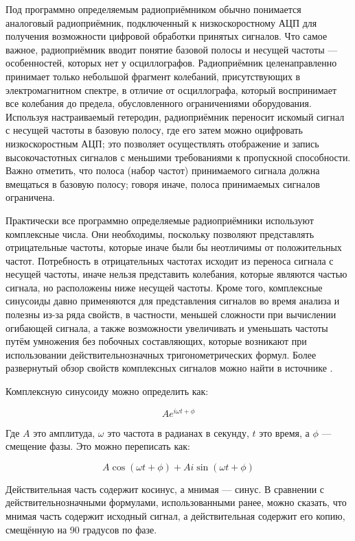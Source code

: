 \documentclass{report}
\begin{document}
Под программно определяемым радиоприёмником обычно понимается аналоговый радиоприёмник, подключенный к низкоскоростному АЦП для получения возможности цифровой обработки принятых сигналов. Что самое важное, радиоприёмник вводит понятие базовой полосы и несущей частоты --- особенностей, которых нет у осциллографов. Радиоприёмник целенаправленно принимает только небольшой фрагмент колебаний, присутствующих в электромагнитном спектре, в отличие от осциллографа, который воспринимает все колебания до предела, обусловленного ограничениями оборудования. Используя настраиваемый гетеродин, радиоприёмник переносит искомый сигнал с несущей частоты в базовую полосу, где его затем можно оцифровать низкоскоростным АЦП; это позволяет осуществлять отображение и запись высокочастотных сигналов с меньшими требованиями к пропускной способности. Важно отметить, что полоса (набор частот) принимаемого сигнала должна вмещаться в базовую полосу; говоря иначе, полоса принимаемых сигналов ограничена.

Практически все программно определяемые радиоприёмники используют комплексные числа. Они необходимы, поскольку позволяют представлять отрицательные частоты, которые иначе были бы неотличимы от положительных частот. Потребность в отрицательных частотах исходит из переноса сигнала с несущей частоты, иначе нельзя представить колебания, которые являются частью сигнала, но расположены ниже несущей частоты. Кроме того, комплексные синусоиды давно применяются для представления сигналов во время анализа и полезны из-за ряда свойств, в частности, меньшей сложности при вычислении огибающей сигнала, а также возможности увеличивать и уменьшать частоты путём умножения без побочных составляющих, которые возникают при использовании действительнозначных тригонометрических формул. Более развернутый обзор свойств комплексных сигналов можно найти в источнике \cite{iq_data}.

Комплексную синусоиду можно определить как:

$$
A e^{i \omega t + \phi}
$$

Где $A$ это амплитуда, $\omega$ это частота в радианах в секунду, $t$ это время, а $\phi$ --- смещение фазы. Это можно переписать как:

$$
A \cos(\omega t + \phi) + A i \sin(\omega t + \phi)
$$

Действительная часть содержит косинус, а мнимая --- синус. В сравнении с действительнозначными формулами, использованными ранее, можно сказать, что мнимая часть содержит исходный сигнал, а действительная содержит его копию, смещённую на 90 градусов по фазе.
\end{document}
